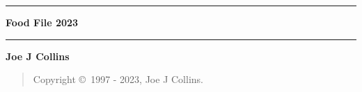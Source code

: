 \documentclass{./FoodFile}
\begin{document}
\thispagestyle{empty}
\begin{center}
\hrule
\vspace{5mm}
{\Huge\bf Food File 2023}
\vspace{5mm}
\hrule
\vfill
{\bf Joe J Collins}
\end{center}
\clearpage
\strut %
\vfill
\begin{quotation}
Copyright \copyright\ 1997 - 2023, Joe J Collins.
\end{quotation}
\clearpage
{}


\printindex
\end{document}
